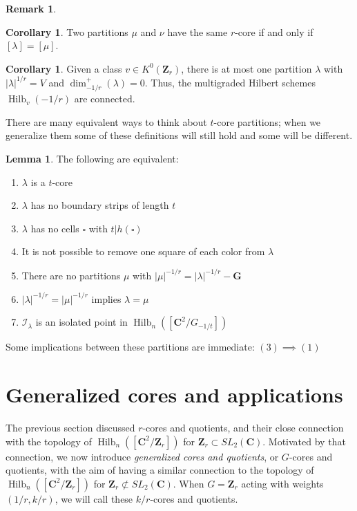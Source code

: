 \documentclass{amsart}[12pt]
\theoremstyle{definition}
\newtheorem{lemma}[dummy]{Lemma}
\newtheorem{corollary}[dummy]{Corollary}
\newtheorem{remark}[dummy]{Remark}
\newcommand{\Z}{\mathbf{Z}}
\newcommand{\C}{\mathbf{C}}
\newcommand{\II}{\mathcal{I}}
\newcommand{\Reg}{\mathbf{G}}
\DeclareMathOperator{\Hilb}{Hilb}
\begin{document}
\begin{remark}
\begin{corollary}
  Two partitions $\mu$ and $\nu$ have the same $r$-core if and only if $[\lambda]=[\mu]$.
\end{corollary}

\begin{corollary}
  Given a class $v\in K^0(\Z_r)$, there is at most one partition $\lambda$ with $|\lambda|^{1/r}=V$ and $\dim^+_{-1/r}(\lambda)=0$.  Thus, the multigraded Hilbert schemes $\Hilb_v(-1/r)$ are connected.
  \end{corollary}






There are many equivalent ways to think about $t$-core partitions; when we generalize them some of these definitions will still hold and some will be different.

\begin{lemma}
The following are equivalent:
\begin{enumerate}
\item $\lambda$ is a $t$-core
\item $\lambda$ has no boundary strips of length $t$
\item $\lambda$ has no cells $\square$ with $t|h(\square)$
\item It is not possible to remove one square of each color from $\lambda$
\item There are no partitions $\mu$ with $|\mu|^{-1/r}=|\lambda|^{-1/r}-\Reg$
\item $|\lambda|^{-1/r}=|\mu|^{-1/r}$ implies $\lambda=\mu$ 
\item $\II_\lambda$ is an isolated point in $\Hilb_n([\C^2/G_{-1/t}])$
\end{enumerate}


\end{lemma}
Some implications between these partitions are immediate: $(3)\implies(1)$



 


\section{Generalized cores and applications}

The previous section discussed $r$-cores and quotients, and their close connection with the topology of $\Hilb_n([\C^2/\Z_r])$ for $\Z_r\subset SL_2(\C)$.  Motivated by that connection, we now introduce \emph{generalized cores and quotients}, or $G$-cores and quotients, with the aim of having a similar connection to the topology of $\Hilb_n([\C^2/\Z_r])$ for $\Z_r\not\subset SL_2(\C)$.  When $G=\Z_r$ acting with weights $(1/r, k/r)$, we will call these $k/r$-cores and quotients.  


\end{remark}
\end{document}

